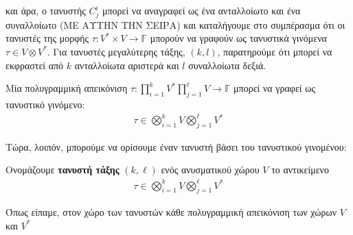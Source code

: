 \documentclass[main.tex]{subfiles}
\begin{document}
 	και άρα, ο τανυστής $C^i_j$ μπορεί να αναγραφεί ως ένα ανταλλοίωτο και ένα συναλλοίωτο (ΜΕ ΑΥΤΗΝ ΤΗΝ ΣΕΙΡΑ) και καταλήγουμε στο συμπέρασμα ότι οι τανυστές της μορφής ${\tau:V^*\times V \rightarrow\mathbb{F}}$ μπορούν να γραφούν ως τανυστικά γινόμενα $\tau \in V\otimes V^*$. Για τανυστές μεγαλύτερης τάξης, $(k,l)$, παρατηρούμε ότι μπορεί να εκφραστεί από $k$ ανταλλοίωτα αριστερά και $l$ συναλλοίωτα δεξιά.
 	\begin{corollary}
 		Μία πολυγραμμική απεικόνιση ${\tau:\prod_{i=1}^{k}V^*\prod_{j=1}^{\ell}V\rightarrow\mathbb{F}}$ μπορεί να γραφεί ως τανυστικό γινόμενο:
 		\begin{align*}
 			\tau \in \bigotimes_{i=1}^{k}V\bigotimes_{j=1}^{\ell}V^*
 		\end{align*}
 	\end{corollary}
	
	Τώρα, λοιπόν, μπορούμε να ορίσουμε έναν τανυστή βάσει του τανυστικού γινομένου:
	\begin{definition}
		Ονομάζουμε \textbf{τανυστή τάξης} $(k,\ell)$ ενός ανυσματικού χώρου $V$ το αντικείμενο
		\begin{align*}
			\tau \in \bigotimes_{i=1}^{k}V\bigotimes_{j=1}^{\ell}V^*
		\end{align*}
	\end{definition}

	Όπως είπαμε, στον χώρο των τανυστών κάθε πολυγραμμική απεικόνιση των χώρων $V$ και $V^*$ 
\end{document}
